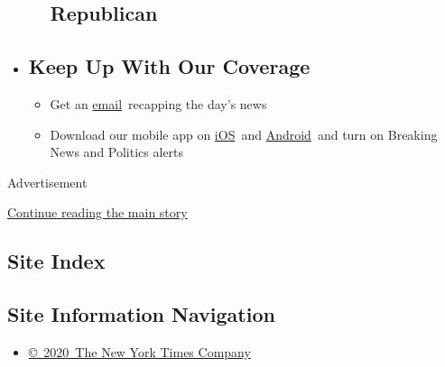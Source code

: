\begin{itemize}
\begin{itemize}
    \hypertarget{republican}{%
    \subsection{Republican}\label{republican}}
  \end{itemize}
\item
  \hypertarget{keep-up-with-our-coverage}{%
  \subsection{Keep Up With Our
  Coverage}\label{keep-up-with-our-coverage}}

  \begin{itemize}
  \item
    Get an
    \href{https://www.nytimes3xbfgragh.onion/newsletters/politics?action=click\&pgtype=Article\&state=default\&region=BELOW_MAIN_CONTENT\&context=storylines_guide}{email}~recapping
    the day's news
  \item
    Download our mobile app on
    \href{https://apps.apple.com/us/app/nytimes/id284862083?ls=1\&mat_click_id=5c79ae7455014fd1bd66b5610c05b8f2-20191112-16948\&referrer=mat_click_id\%3D5c79ae7455014fd1bd66b5610c05b8f2-20191112-16948\%26link_click_id\%3D722930677036718082}{iOS}~and
    \href{http://a.localytics.com/android?id=com.nytimes.android\&referrer=utm_source\%3Dother_nyt_mobile_web\%26utm_medium\%3DWeb\%2520page\%26utm_term\%3DGeneral\%2520Mobile\%2520Page\%26utm_campaign\%3DNYT\%2520Mobile\%2520General\%2520Page}{Android}~and
    turn on Breaking News and Politics alerts
  \end{itemize}
\end{itemize}

Advertisement

\protect\hyperlink{after-bottom}{Continue reading the main story}

\hypertarget{site-index}{%
\subsection{Site Index}\label{site-index}}

\hypertarget{site-information-navigation}{%
\subsection{Site Information
Navigation}\label{site-information-navigation}}

\begin{itemize}
\tightlist
\item
  \href{https://help.nytimes3xbfgragh.onion/hc/en-us/articles/115014792127-Copyright-notice}{©~2020~The
  New York Times Company}
\end{itemize}

